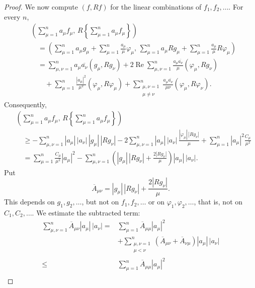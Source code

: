﻿\documentclass[paper=b5,fontsize=13pt,bookmarkpackage=false,twoside]{scrartcl}
\newcounter{translatornote}
\begin{document}
\begin{proof}
We now compute $(f,Rf)$ for the linear combinations of $f_1,f_2,\ldots$. For every $n$,
\begin{align*}
&\left(\sum_{\mu=1}^{n}a_\mu f_\mu,\,
R\left\{\sum_{\mu=1}^{n}a_\mu f_\mu\right\}\right)\\
&\quad=
\left(
\sum_{\mu=1}^{n}a_\mu g_\mu
+\sum_{\mu=1}^{n}\frac{a_\mu}{\mu}\varphi_\mu,\,
\sum_{\mu=1}^{n}a_\mu Rg_\mu
+\sum_{\mu=1}^{n}\frac{a_\mu}{\mu}R\varphi_\mu
\right)\\
&\quad=
\sum_{\mu,\nu=1}^{n}
a_\mu\overline{a_\nu}(g_\mu,Rg_\nu)
+2\operatorname{Re}\sum_{\mu,\nu=1}^{n}
\frac{a_\mu\overline{a_\nu}}{\mu}
(\varphi_\mu,Rg_\nu)\\
&\qquad
+\sum_{\mu=1}^{n}
\frac{|a_\mu|^2}{\mu^2}
(\varphi_\mu,R\varphi_\mu)
+\sum_{\substack{\mu,\nu=1\\\mu\ne\nu}}^{n}
\frac{a_\mu\overline{a_\nu}}{\mu\nu}
(\varphi_\mu,R\varphi_\nu).
\end{align*}
Consequently,
\begin{align*}
&\left(\sum_{\mu=1}^{n}a_\mu f_\mu,\,
R\left\{\sum_{\mu=1}^{n}a_\mu f_\mu\right\}\right)\\
&\quad\ge
-\sum_{\mu,\nu=1}^{n}
|a_\mu|\,|a_\nu|\,|g_\mu|\,|Rg_\nu|
-2\sum_{\mu,\nu=1}^{n}
|a_\mu|\,|a_\nu|\,
\frac{|\varphi_\mu|\,|Rg_\nu|}{\mu}
+\sum_{\mu=1}^{n}|a_\mu|^2\frac{C_\mu}{\mu^2}\\
&\quad=
\sum_{\mu=1}^{n}\frac{C_\mu}{\mu^2}|a_\mu|^2
-\sum_{\mu,\nu=1}^{n}
\left(|g_\mu|\,|Rg_\nu|+\frac{2|Rg_\nu|}{\mu}\right)
|a_\mu|\,|a_\nu|.
\end{align*}
Put
\[
\overline A_{\mu\nu}
=|g_\mu|\,|Rg_\nu|+\frac{2|Rg_\nu|}{\mu}.
\]
This depends on $g_1,g_2,\ldots$, but not on $f_1,f_2,\ldots$ or on $\varphi_1,\varphi_2,\ldots$, that is, not on $C_1,C_2,\ldots$. We estimate the subtracted term:
\begin{align*}
\sum_{\mu,\nu=1}^{n}
\overline A_{\mu\nu}|a_\mu|\,|a_\nu|
={}&
\sum_{\mu=1}^{n}\overline A_{\mu\mu}|a_\mu|^2\\
&+\sum_{\substack{\mu,\nu=1\\\mu<\nu}}^{n}
(\overline A_{\mu\nu}+\overline A_{\nu\mu})
|a_\mu|\,|a_\nu|\\
\le{}&
\sum_{\mu=1}^{n}\overline A_{\mu\mu}|a_\mu|^2\\

\end{align*}
\end{proof}
\end{document}
